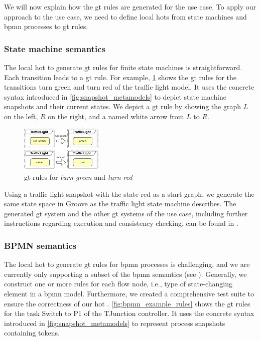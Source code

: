 \documentclass{jot}
\begin{document}
We will now explain how the \gls*{gt} rules are generated for the use case.
To apply our approach to the use case, we need to define local \gls*{hot}s from state machines and \gls*{bpmn} processes to \gls*{gt} rules.


\subsubsection{State machine semantics}
The local \gls*{hot} to generate \gls*{gt} rules for finite state machines is straightforward.
Each transition leads to a \gls*{gt} rule.
For example, \cref{fig:sm_rule} shows the \gls*{gt} rules for the transitions \textsf{turn green} and \textsf{turn red} of the traffic light model.
It uses the concrete syntax introduced in \cref{fig:snapshot_metamodels} to depict state machine snapshots and their current states.
We depict a \gls*{gt} rule by showing the graph $L$ on the left, $R$ on the right, and a named white arrow from $L$ to $R$.

\begin{figure}[h]
    \centering
    \includegraphics[width=0.35\textwidth]{figures/sm_rule.pdf}
    \caption{\gls*{gt} rules for \textit{turn green} and \textit{turn red}}
    \label{fig:sm_rule}
\end{figure}

Using a traffic light snapshot with the state red as a start graph, we generate the same state space in Groove as the traffic light state machine describes.
The generated \gls*{gt} system and the other \gls*{gt} systems of the use case, including further instructions regarding execution and consistency checking, can be found in \cite{krauterArtifactsBehavioralConsistency2023}.


\subsubsection{BPMN semantics}
The local \gls*{hot} to generate \gls*{gt} rules for \gls*{bpmn} processes is challenging, and we are currently only supporting a subset of the \gls*{bpmn} semantics (see \cite{krauterArtifactsBehavioralConsistency2023}).
Generally, we construct one or more rules for each flow node, i.e., type of state-changing element in a \gls*{bpmn} model.
Furthermore, we created a comprehensive test suite to ensure the correctness of our \gls*{hot} \cite{krauterArtifactsBehavioralConsistency2023}.
\autoref{fig:bpmn_example_rules} shows the \gls*{gt} rules for the task \textsf{Switch to P1} of the TJunction controller.
It uses the concrete syntax introduced in \cref{fig:snapshot_metamodels} to represent process snapshots containing tokens.
\end{document}

